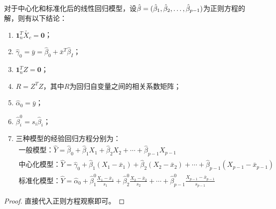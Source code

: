 \begin{theorem}\label{theo:CenterStandardLinearModel}
	对于中心化和标准化后的线性回归模型，设$\hat{\beta}=(\hat{\beta}_1, \hat{\beta}_2, \dots, \hat{\beta}_{p-1})$为正则方程的解，则有以下结论：
	\begin{enumerate}
		\item $\mathbf{1}_n^T\tilde{X_c}=\mathbf{0}$；
		\item $\hat{\gamma}_0=\bar{y}=\hat{\beta}_0+\bar{x}^T\hat{\beta}_I$；
		\item $\mathbf{1}_n^TZ=\mathbf{0}$；
		\item $R=Z^TZ$，其中$R$为回归自变量之间的相关系数矩阵；
		\item $\hat{\alpha}_0=\bar{y}$；
		\item $\hat{\beta}_i^0=s_i\hat{\beta}_i$；
		\item 三种模型的经验回归方程分别为：
		\begin{gather*}
			\text{一般模型：}\hat{Y}=\hat{\beta}_0+\hat{\beta}_1X_1+\hat{\beta}_2X_2+\cdots+\hat{\beta}_{p-1}X_{p-1} \\
			\text{中心化模型：}\hat{Y}=\hat{\gamma}_0+\hat{\beta}_1(X_1-\bar{x}_1)+\hat{\beta}_2(X_2-\bar{x}_2)+\cdots+\hat{\beta}_{p-1}(X_{p-1}-\bar{x}_{p-1}) \\
			\text{标准化模型：}\hat{Y}=\hat{\alpha}_0+\hat{\beta}_1^0\frac{X_1-\bar{x}_1}{s_1}+\hat{\beta}_2^0\frac{X_2-\bar{x}_2}{s_2}+\cdots+\hat{\beta}_{p-1}^0\frac{X_{p-1}-\bar{x}_{p-1}}{s_{p-1}}
		\end{gather*}
	\end{enumerate}
\end{theorem}
\begin{proof}
	直接代入正则方程观察即可。
\end{proof}

